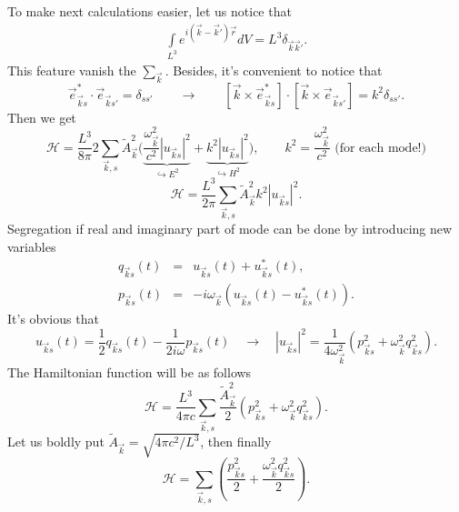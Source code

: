 	To make next calculations easier, let us notice that
	\begin{eqnarray}
		\int \limits_{L^3} e^{i (\vec{k} - \vec{k}')\vec{r}} dV = L^3 \delta_{\vec{k}\vec{k}'}.
	\end{eqnarray}
	This feature vanish the $\sum_{\vec{k}}$. Besides, it's convenient to notice that
	\begin{equation}
		\vec{e}_{\vec{k}s}^* \cdot \vec{e}_{\vec{k}s'} = \delta_{ss'} \qquad \to \qquad
		\left[ \vec{k} \times \vec{e}_{\vec{k}s}^* \right] \cdot \left[ \vec{k} \times \vec{e}_{\vec{k}s'} \right] = k^2 \delta_{ss'}.
	\end{equation}
	Then we get
	\begin{equation}
		\mathscr{H} = \frac{L^3}{8 \pi}2 \sum_{\vec{k},s} \tilde{A}_{\vec{k}}^2 \Bigg( \underbrace{\frac{\omega_{\vec{k}}^2}{c^2} \left| u_{\vec{k}s} \right|^2}_{\hookrightarrow E^2} + \underbrace{k^2 \left| u_{\vec{k}s} \right|^2}_{\hookrightarrow H^2}  \Bigg), \qquad k^2 = \frac{\omega_{\vec{k}}^2}{c^2} \text{\ \ (for each mode!)}
	\end{equation}
	\begin{equation}
		\mathscr{H} = \frac{L^3}{2 \pi} \sum_{\vec{k},s} \tilde{A}_{\vec{k}}^2 k^2 \left| u_{\vec{k}s} \right|^2.
	\end{equation}
	Segregation if real and imaginary part of mode can be done by introducing new variables
	\begin{eqnarray}
		q_{\vec{k}s}(t) &=& u_{\vec{k}s}(t) + u^*_{\vec{k}s}(t) , \\
		p_{\vec{k}s}(t) &=& -i \omega_{\vec{k}}  \left( u_{\vec{k}s}(t) - u^*_{\vec{k}s}(t) \right).
	\end{eqnarray}
	It's obvious that
	\begin{equation}
		u_{\vec{k}s}(t) = \frac{1}{2} q_{\vec{k}s}(t) - \frac{1}{2 i \omega} p_{\vec{k}s}(t) \quad \to \quad \left| u_{\vec{k}s} \right|^2 = \frac{1}{4 \omega_{\vec{k}}^2} \left( p^2_{\vec{k}s} + \omega^2_{\vec{k}} q_{\vec{k}s}^2 \right).
	\end{equation}
	The Hamiltonian function will be as follows
	\begin{equation}
		\mathscr{H} = \frac{L^3}{4 \pi c} \sum_{\vec{k},s} \frac{\tilde{A}_{\vec{k}}^2}{2} \left( p^2_{\vec{k}s} + \omega^2_{\vec{k}} q_{\vec{k}s}^2 \right).
	\end{equation}
	Let us boldly put $\tilde{A}_{\vec{k}} = \sqrt{4 \pi c^2/L^3}$, then finally
	\begin{equation}
		\mathscr{H} = \sum_{\vec{k},s}  \left( \frac{p^2_{\vec{k}s}}{2}+ \frac{\omega^2_{\vec{k}} q_{\vec{k}s}^2}{2} \right).
	\end{equation}
	
